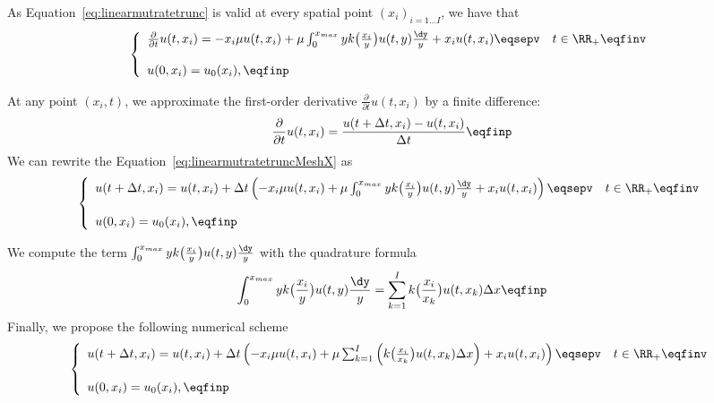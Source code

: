 As Equation~\eqref{eq:linearmutratetrunc} is valid at every spatial point $(x_i)_{i = 1 \ldots I}$, we have that
\begin{equation}\left\{
    \begin{array}{ll}
	\frac{\partial}{\partial t}u(t,x_i) = - x_i\mu u(t,x_i) + \mu \int_{0}^{x_{max}} y k\big( \frac{x_i}{y}\big) u(t,y) \frac{\dy}{y} + x_iu(t,x_i)
	\eqsepv
	& t \in \RR_+ \eqfinv
	\\ \\
	u(0, x_i) = u_0(x_i),
	\eqfinp
    \end{array}
	\right.
    \label{eq:linearmutratetruncMeshX}
\end{equation}


At any point $(x_i, t)$, we approximate the first-order derivative $\frac{\partial}{\partial t}u(t,x_i)$ by a finite difference:
$$\frac{\partial}{\partial t}u(t,x_i) = \frac{u(t+\Delta t,x_i) - u(t,x_i)}{\Delta t}
\eqfinp$$
We can rewrite the Equation~\eqref{eq:linearmutratetruncMeshX} as
\begin{equation}\left\{
    \begin{array}{ll}
        u(t+\Delta t,x_i) = u(t,x_i) + \Delta t \left(- x_i\mu u(t,x_i) + \mu \int_{0}^{x_{max}} y k\big( \frac{x_i}{y}\big) u(t,y) \frac{\dy}{y} + x_iu(t,x_i) \right)
	\eqsepv
	& t \in \RR_+ \eqfinv
	\\ \\
	u(0, x_i) = u_0(x_i),
	\eqfinp
    \end{array}
	\right.
    \label{eq:linearmutratetruncMeshX}
\end{equation}

We compute the term $\int_{0}^{x_{max}} y k\big( \frac{x_i}{y}\big) u(t,y) \frac{\dy}{y}$ with the quadrature formula
$$ \int_{0}^{x_{max}} y k\big( \frac{x_i}{y}\big) u(t,y) \frac{\dy}{y}
= \sum_{k = 1}^I k \big( \frac{x_i}{x_k}\big) u(t,x_k) \Delta x \eqfinp
$$ 
Finally, we propose the following numerical scheme
\begin{equation}\left\{
    \begin{array}{ll}
        u(t+\Delta t,x_i) = u(t,x_i) + \Delta t \left(- x_i\mu u(t,x_i) + \mu \sum_{k = 1}^I \left(k \big( \frac{x_i}{x_k}\big) u(t,x_k) \Delta x \right) + x_iu(t,x_i) \right)
	\eqsepv
	& t \in \RR_+ \eqfinv
	\\ \\
	u(0, x_i) = u_0(x_i),
	\eqfinp
    \end{array}
	\right.
    \label{eq:numericalScheme}
\end{equation}
